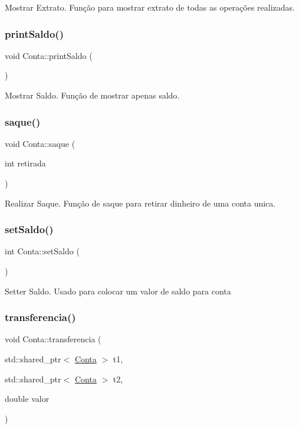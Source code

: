 Mostrar Extrato. Função para mostrar extrato de todas as operações realizadas. \mbox{\label{classConta_a00065eb73daf114c929f775b4750324b}} 
\subsubsection{\texorpdfstring{print\+Saldo()}{printSaldo()}}
{\footnotesize\ttfamily void Conta\+::print\+Saldo (\begin{DoxyParamCaption}{ }\end{DoxyParamCaption})}

Mostrar Saldo. Função de mostrar apenas saldo. \mbox{\label{classConta_a27d1541cad3d26df35ca230d6640cc85}} 
\subsubsection{\texorpdfstring{saque()}{saque()}}
{\footnotesize\ttfamily void Conta\+::saque (\begin{DoxyParamCaption}\item[{int}]{retirada }\end{DoxyParamCaption})}

Realizar Saque. Função de saque para retirar dinheiro de uma conta unica. \mbox{\label{classConta_a2f7bbd9a98bb1e62b04bf9f2d2e126bf}} 
\subsubsection{\texorpdfstring{set\+Saldo()}{setSaldo()}}
{\footnotesize\ttfamily int Conta\+::set\+Saldo (\begin{DoxyParamCaption}{ }\end{DoxyParamCaption})}

Setter Saldo. Usado para colocar um valor de saldo para conta \mbox{\label{classConta_a92552b6c27a145002ffc247b9835834b}} 
\subsubsection{\texorpdfstring{transferencia()}{transferencia()}}
{\footnotesize\ttfamily void Conta\+::transferencia (\begin{DoxyParamCaption}\item[{std\+::shared\+\_\+ptr$<$ \hyperlink{classConta}{Conta} $>$}]{t1,  }\item[{std\+::shared\+\_\+ptr$<$ \hyperlink{classConta}{Conta} $>$}]{t2,  }\item[{double}]{valor }\end{DoxyParamCaption})}

